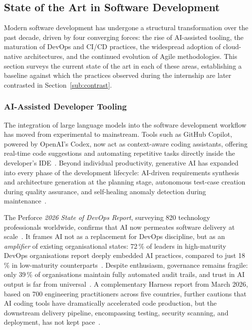  
\vspace*{0.5cm}
\subsection{State of the Art in Software Development}\label{sub:sota}
 
Modern software development has undergone a structural transformation
over the past decade, driven by four converging forces: the rise of
AI-assisted tooling, the maturation of DevOps and CI/CD practices,
the widespread adoption of cloud-native architectures, and the
continued evolution of Agile methodologies.
This section surveys the current state of the art in each of these
areas, establishing a baseline against which the practices observed
during the internship are later contrasted in
Section~\ref{sub:contrast}.
 
 
\subsubsection{AI-Assisted Developer Tooling}\label{subsub:sota:ai}
 
The integration of large language models into the software development
workflow has moved from experimental to mainstream.
Tools such as GitHub Copilot, powered by OpenAI's Codex, now act as
context-aware coding assistants, offering real-time code suggestions
and automating repetitive tasks directly inside the developer's
IDE~\cite{softjourn2025aidevops}.
Beyond individual productivity, generative AI has expanded into every
phase of the development lifecycle: AI-driven requirements synthesis
and architecture generation at the planning stage, autonomous
test-case creation during quality assurance, and self-healing anomaly
detection during maintenance~\cite{cio2026future}.
 
The Perforce \textit{2026 State of DevOps Report}, surveying 820
technology professionals worldwide, confirms that AI now permeates
software delivery at scale~\cite{perforce2026devops}.
It frames AI not as a replacement for DevOps discipline, but as an
\textit{amplifier} of existing organisational states: 72\,\% of
leaders in high-maturity DevOps organisations report deeply embedded
AI practices, compared to just 18\,\% in low-maturity
counterparts~\cite{perforce2026devops}.
Despite enthusiasm, governance remains fragile: only 39\,\% of
organisations maintain fully automated audit trails, and trust in
AI output is far from universal~\cite{perforce2026devops}.
A complementary Harness report from March 2026, based on 700
engineering practitioners across five countries, further cautions that
AI coding tools have dramatically accelerated code production, but
the downstream delivery pipeline, encompassing testing, security
scanning, and deployment, has not kept pace~\cite{harness2026devops}.
 
